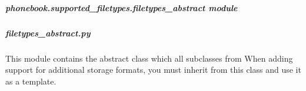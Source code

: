 \documentclass[letterpaper,10pt,english]{sphinxmanual}
\begin{document}

\begin{fulllineitems}
\label{\detokenize{phonebook.supported_filetypes:phonebook.supported_filetypes.filetypes.query_filetypes}}
\end{fulllineitems}



\subparagraph{phonebook.supported\_filetypes.filetypes\_abstract module}
\label{\detokenize{phonebook.supported_filetypes:module-phonebook.supported_filetypes.filetypes_abstract}}\label{\detokenize{phonebook.supported_filetypes:phonebook-supported-filetypes-filetypes-abstract-module}}

\subparagraph{filetypes\_abstract.py}
\label{\detokenize{phonebook.supported_filetypes:filetypes-abstract-py}}
This module contains the abstract class which all subclasses from {\hyperref[\detokenize{phonebook.supported_filetypes:module-phonebook.supported_filetypes.filetypes}]{}}
When adding support for additional storage formats, you must inherit from this class and use it as a template.
\end{document}
